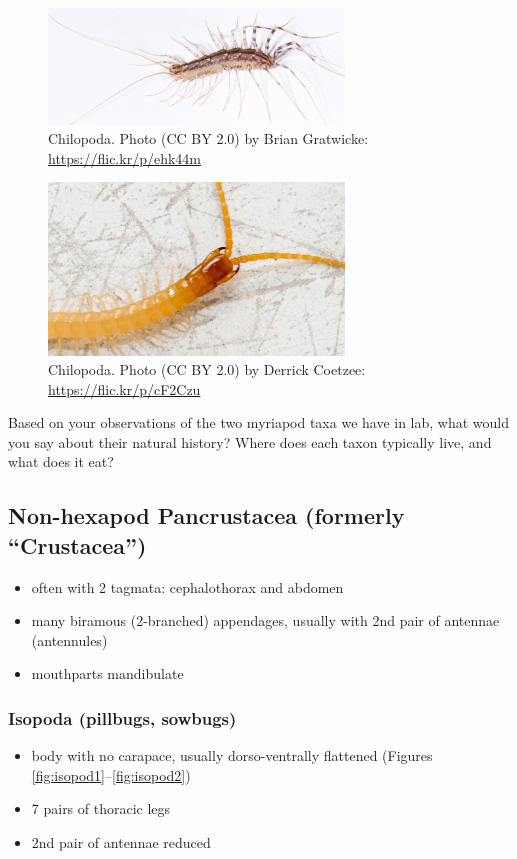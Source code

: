 \documentclass[letterpaper, 11pt]{article}
\begin{document}
\begin{figure}[ht!]
    \centering
        \includegraphics[width=0.7\textwidth]{chilo1}
        \caption{Chilopoda. Photo (CC BY 2.0) by Brian Gratwicke: \url{https://flic.kr/p/ehk44m}}
        \label{fig:chilo1}
\end{figure}

\begin{figure}[ht!]
	\centering
        \includegraphics[width=0.7\textwidth]{chilo2}
        \caption{Chilopoda. Photo (CC BY 2.0) by Derrick Coetzee: \url{https://flic.kr/p/cF2Czu}}
        \label{fig:chilo2}
\end{figure}

\noindent{}Based on your observations of the two myriapod taxa we have in lab, what would you say about their natural history? Where does each taxon typically live, and what does it eat?\vspace{4cm}

\subsection{Non-hexapod Pancrustacea (formerly ``Crustacea'')}
\begin{itemize}
\item often with 2 tagmata: cephalothorax and abdomen
\item many biramous (2-branched) appendages, usually with 2nd pair of antennae (antennules)
\item mouthparts mandibulate
\end{itemize}

\subsubsection*{Isopoda (pillbugs, sowbugs)}
\begin{itemize}
\item body with no carapace, usually dorso-ventrally flattened (Figures \ref{fig:isopod1}--\ref{fig:isopod2})
\item 7 pairs of thoracic legs
\item 2nd pair of antennae reduced
\end{itemize}
\end{document}
